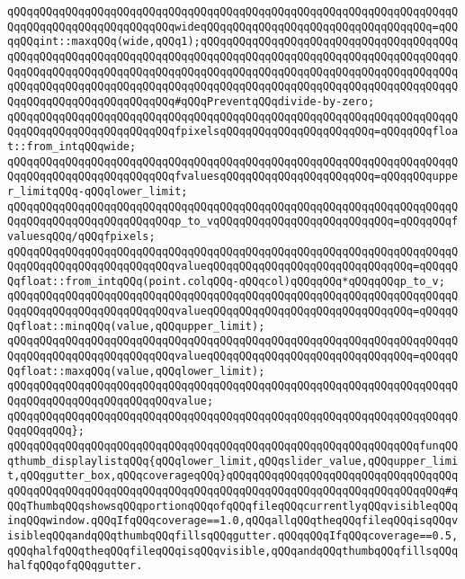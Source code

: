 \verb|qQQqqQQqqQQqqQQqqQQqqQQqqQQqqQQqqQQqqQQqqQQqqQQqqQQqqQQqqQQqqQQqqQQqqQQqqQQqqQQqqQQqqQQqqQQqqQQqwideqQQqqQQqqQQqqQQqqQQqqQQqqQQqqQQqqQQq=qQQqqQQqint::maxqQQq(wide,qQQq1);qQQqqQQqqQQqqQQqqQQqqQQqqQQqqQQqqQQqqQQqqQQqqQQqqQQqqQQqqQQqqQQqqQQqqQQqqQQqqQQqqQQqqQQqqQQqqQQqqQQqqQQqqQQqqQQqqQQqqQQqqQQqqQQqqQQqqQQqqQQqqQQqqQQqqQQqqQQqqQQqqQQqqQQqqQQqqQQqqQQqqQQqqQQqqQQqqQQqqQQqqQQqqQQqqQQqqQQqqQQqqQQqqQQqqQQqqQQqqQQqqQQqqQQqqQQqqQQqqQQqqQQqqQQqqQQqqQQq#qQQqPreventqQQqdivide-by-zero;|\newline
\newline
\verb|qQQqqQQqqQQqqQQqqQQqqQQqqQQqqQQqqQQqqQQqqQQqqQQqqQQqqQQqqQQqqQQqqQQqqQQqqQQqqQQqqQQqqQQqqQQqqQQqfpixelsqQQqqQQqqQQqqQQqqQQqqQQq=qQQqqQQqfloat::from_intqQQqwide;|\newline
\verb|qQQqqQQqqQQqqQQqqQQqqQQqqQQqqQQqqQQqqQQqqQQqqQQqqQQqqQQqqQQqqQQqqQQqqQQqqQQqqQQqqQQqqQQqqQQqqQQqfvaluesqQQqqQQqqQQqqQQqqQQqqQQq=qQQqqQQqupper_limitqQQq-qQQqlower_limit;|\newline
\newline
\verb|qQQqqQQqqQQqqQQqqQQqqQQqqQQqqQQqqQQqqQQqqQQqqQQqqQQqqQQqqQQqqQQqqQQqqQQqqQQqqQQqqQQqqQQqqQQqqQQqp_to_vqQQqqQQqqQQqqQQqqQQqqQQqqQQq=qQQqqQQqfvaluesqQQq/qQQqfpixels;|\newline
\newline
\verb|qQQqqQQqqQQqqQQqqQQqqQQqqQQqqQQqqQQqqQQqqQQqqQQqqQQqqQQqqQQqqQQqqQQqqQQqqQQqqQQqqQQqqQQqqQQqqQQqvalueqQQqqQQqqQQqqQQqqQQqqQQqqQQqqQQq=qQQqqQQqfloat::from_intqQQq(point.colqQQq-qQQqcol)qQQqqQQq*qQQqqQQqp_to_v;|\newline
\newline
\verb|qQQqqQQqqQQqqQQqqQQqqQQqqQQqqQQqqQQqqQQqqQQqqQQqqQQqqQQqqQQqqQQqqQQqqQQqqQQqqQQqqQQqqQQqqQQqqQQqvalueqQQqqQQqqQQqqQQqqQQqqQQqqQQqqQQq=qQQqqQQqfloat::minqQQq(value,qQQqupper_limit);|\newline
\verb|qQQqqQQqqQQqqQQqqQQqqQQqqQQqqQQqqQQqqQQqqQQqqQQqqQQqqQQqqQQqqQQqqQQqqQQqqQQqqQQqqQQqqQQqqQQqqQQqvalueqQQqqQQqqQQqqQQqqQQqqQQqqQQqqQQq=qQQqqQQqfloat::maxqQQq(value,qQQqlower_limit);|\newline
\newline
\verb|qQQqqQQqqQQqqQQqqQQqqQQqqQQqqQQqqQQqqQQqqQQqqQQqqQQqqQQqqQQqqQQqqQQqqQQqqQQqqQQqqQQqqQQqqQQqqQQqvalue;|\newline
\verb|qQQqqQQqqQQqqQQqqQQqqQQqqQQqqQQqqQQqqQQqqQQqqQQqqQQqqQQqqQQqqQQqqQQqqQQqqQQqqQQq};|\newline
\newline
\verb|qQQqqQQqqQQqqQQqqQQqqQQqqQQqqQQqqQQqqQQqqQQqqQQqqQQqqQQqqQQqqQQqfunqQQqthumb_displaylistqQQq{qQQqlower_limit,qQQqslider_value,qQQqupper_limit,qQQqgutter_box,qQQqcoverageqQQq}qQQqqQQqqQQqqQQqqQQqqQQqqQQqqQQqqQQqqQQqqQQqqQQqqQQqqQQqqQQqqQQqqQQqqQQqqQQqqQQqqQQqqQQqqQQqqQQqqQQqqQQq#qQQqThumbqQQqshowsqQQqportionqQQqofqQQqfileqQQqcurrentlyqQQqvisibleqQQqinqQQqwindow.qQQqIfqQQqcoverage==1.0,qQQqallqQQqtheqQQqfileqQQqisqQQqvisibleqQQqandqQQqthumbqQQqfillsqQQqgutter.qQQqqQQqIfqQQqcoverage==0.5,qQQqhalfqQQqtheqQQqfileqQQqisqQQqvisible,qQQqandqQQqthumbqQQqfillsqQQqhalfqQQqofqQQqgutter.|\newline

